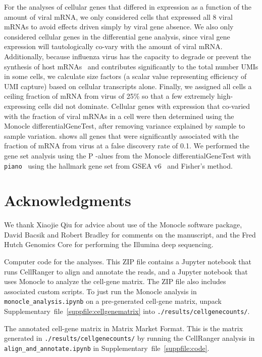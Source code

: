 \documentclass[9pt,lineno]{elife}
\begin{document}
For the analyses of cellular genes that differed in expression as a function of the amount of viral mRNA, we only considered cells that expressed all 8 viral mRNAs to avoid effects driven simply by viral gene absence.
We also only considered cellular genes in the differential gene analysis, since viral gene expression will tautologically co-vary with the amount of viral mRNA.
Additionally, because influenza virus has the capacity to degrade or prevent the synthesis of host mRNAs~\citep{BercovichKinori:2016iw} and contributes significantly to the total number UMIs in some cells, we calculate size factors (a scalar value representing efficiency of UMI capture) based on cellular transcripts alone. 
Finally, we assigned all cells a ceiling fraction of mRNA from virus of 25\% so that a few extremely high-expressing cells did not dominate. 
Cellular genes with expression that co-varied with the fraction of viral mRNAs in a cell were then determined using the Monocle differentialGeneTest, after removing variance explained by sample to sample variation. 
 shows all genes that were significantly associated with the fraction of mRNA from virus at a false discovery rate of 0.1.
We performed the gene set analysis using the P -alues from the Monocle differentialGeneTest with \texttt{piano}~\citep{varemo2013enriching} using the hallmark gene set from GSEA v6~\citep{subramanian2005gene} and Fisher's method.

\section{Acknowledgments}
We thank Xiaojie Qiu for advice about use of the Monocle software package, David Bacsik and Robert Bradley for comments on the manuscript, and the Fred Hutch Genomics Core for performing the Illumina deep sequencing.



\clearpage

\begin{suppfile}
\caption{\label{suppfile:code}
Computer code for the analyses.
This ZIP file contains a Jupyter notebook that runs CellRanger to align and annotate the reads, and a Jupyter notebook that uses Monocle to analyze the cell-gene matrix.
The ZIP file also includes associated custom scripts.
To just run the Monocle analysis in \texttt{monocle\_analysis.ipynb} on a pre-generated cell-gene matrix, unpack Supplementary~file~\ref{suppfile:cellgenematrix} into \texttt{./results/cellgenecounts/}.}
\end{suppfile}

\begin{suppfile}
\caption{\label{suppfile:cellgenematrix}
The annotated cell-gene matrix in Matrix Market Format.
This is the matrix generated in \texttt{./results/cellgenecounts/} by running the CellRanger analysis in \texttt{align\_and\_annotate.ipynb} in Supplementary~file~\ref{suppfile:code}.
}
\end{suppfile}
\end{document}
